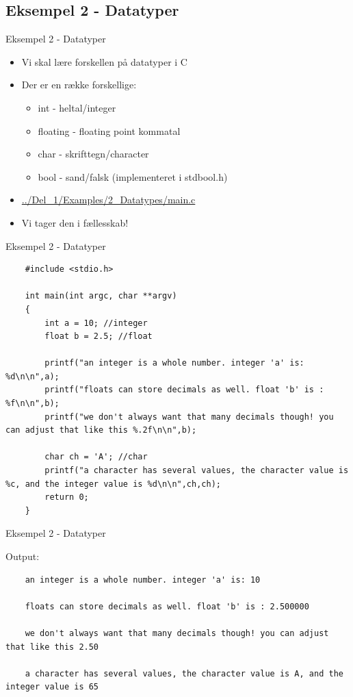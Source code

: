\documentclass{beamer}
\begin{document}
\subsection{Eksempel 2 - Datatyper}
\begin{frame}{Eksempel 2 - Datatyper}
	\begin{itemize}
	\item{Vi skal lære forskellen på datatyper i C}
	\item{Der er en række forskellige:}
		\begin{itemize}
		\item{int - heltal/integer}
		\item{floating - floating point kommatal}
		\item{char - skrifttegn/character}
		\item{bool - sand/falsk (implementeret i stdbool.h)}
		\end{itemize}
	\item{\color{link}\href{https://github.com/Iakop/C-Programmering-for-begyndere/tree/master/Del_1/Examples/2_Datatypes/main.c}{../Del\_1/Examples/2\_Datatypes/main.c}}
	\item{Vi tager den i fællesskab!}
	\end{itemize}
\end{frame}

\begin{frame}[fragile]{Eksempel 2 - Datatyper}
	\begin{lstlisting}
	#include <stdio.h>

	int main(int argc, char **argv)
	{
  		int a = 10; //integer
  		float b = 2.5; //float

		printf("an integer is a whole number. integer 'a' is: %d\n\n",a);
  		printf("floats can store decimals as well. float 'b' is : %f\n\n",b);
  		printf("we don't always want that many decimals though! you can adjust that like this %.2f\n\n",b);
  
  		char ch = 'A'; //char
  		printf("a character has several values, the character value is %c, and the integer value is %d\n\n",ch,ch);
		return 0;
	}
	\end{lstlisting}
\end{frame}

\begin{frame}[fragile]{Eksempel 2 - Datatyper}
	\lstset{language=bash, numbers=none}
	\begin{center}
	Output:
	\lstset{language=bash, numbers=none}
	\begin{lstlisting}
	an integer is a whole number. integer 'a' is: 10

	floats can store decimals as well. float 'b' is : 2.500000

	we don't always want that many decimals though! you can adjust that like this 2.50

	a character has several values, the character value is A, and the integer value is 65

	\end{lstlisting}
	\end{center}
\end{frame}
\end{document}
